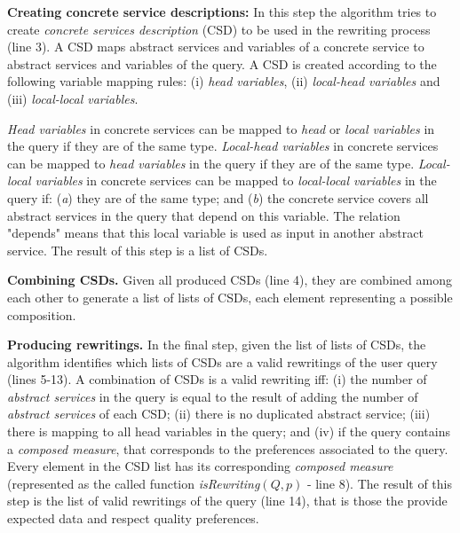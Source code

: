 \noindent \textbf{Creating concrete service descriptions:} In this step  the
 algorithm tries to create \textit{concrete services description} (CSD) to be
 used in the rewriting process (line 3). A CSD maps abstract services and
 variables of a concrete service to abstract services and variables of the
 query. A CSD is created according to the following variable mapping rules:  (i)
 \textit{head variables}, (ii) \textit{local-head variables} and  (iii)
 \textit{local-local variables}.
 
  \textit{Head variables} in concrete services can be mapped to
  \textit{head} or \textit{local variables} in the query if they are of the
  same type. \textit{Local-head variables} in concrete services can be mapped to
  \textit{head variables} in the query if they are of the same type.
  \textit{Local-local variables} in concrete services can be mapped to
  \textit{local-local variables} in the query if: (\textit{a}) they are of the
  same type; and (\textit{b}) the concrete service covers all abstract services in
  the query that depend on this variable. The relation "depends"  means that this local variable is used as input in another abstract service. The  result of this step is a list of CSDs.

 
\noindent \textbf{Combining CSDs.} Given all produced CSDs  (line
4), they are combined among each other to generate  a list of lists of CSDs, each element representing a possible composition.

\noindent \textbf{Producing rewritings.} In the final step, given the list of
 lists of CSDs, the algorithm identifies which lists of CSDs are a valid
 rewritings of the user query (lines 5-13).
A combination of CSDs is a valid rewriting iff: (i) the number of
 \textit{abstract services} in the query is equal to the result of adding the
 number of \textit{abstract services} of each CSD; (ii) there is no duplicated abstract
 service; (iii) there is mapping to all head variables in the
 query; and (iv) if the query contains a \textit{composed measure}, that corresponds to the preferences associated to the query. Every element in the CSD list has its corresponding \textit{composed measure} (represented as the called function \textit{isRewriting}$(Q, p)$ - line 8). The result of this step is the list of valid 
 rewritings of the query (line 14), that is those the provide expected data and respect quality preferences.

